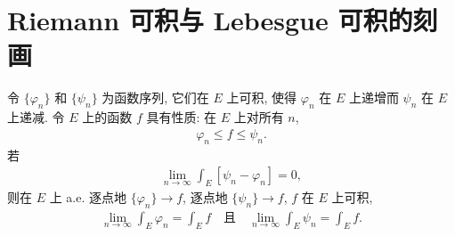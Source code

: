 \documentclass[../../main.tex]{subfiles}
\begin{document}
\section{Riemann 可积与 Lebesgue 可积的刻画}\label{section:ch05-Riemann可积刻画}

\begin{lemma}\label{lemma:ch05-夹逼}
令 $\{\varphi_{n}\}$ 和 $\{\psi_{n}\}$ 为函数序列, 它们在 $E$ 上可积, 使得 $\varphi_{n}$ 在 $E$ 上递增而 $\psi_{n}$ 在 $E$ 上递减. 令 $E$ 上的函数 $f$ 具有性质: 在 $E$ 上对所有 $n$,
\begin{align*}
\varphi_{n}\leqslant f\leqslant\psi_{n}.
\end{align*}
若
\begin{align*}
\lim_{n\to\infty}\int_{E}[\psi_{n}-\varphi_{n}]=0,
\end{align*}
则在 $E$ 上 a.e. 逐点地 $\{\varphi_{n}\}\to f$, 逐点地 $\{\psi_{n}\}\to f$, $f$ 在 $E$ 上可积,
\begin{align*}
\lim_{n\to\infty}\int_{E}\varphi_{n}=\int_{E}f\quad\text{且}\quad\lim_{n\to\infty}\int_{E}\psi_{n}=\int_{E}f.
\end{align*}
\end{lemma}
\end{document}
